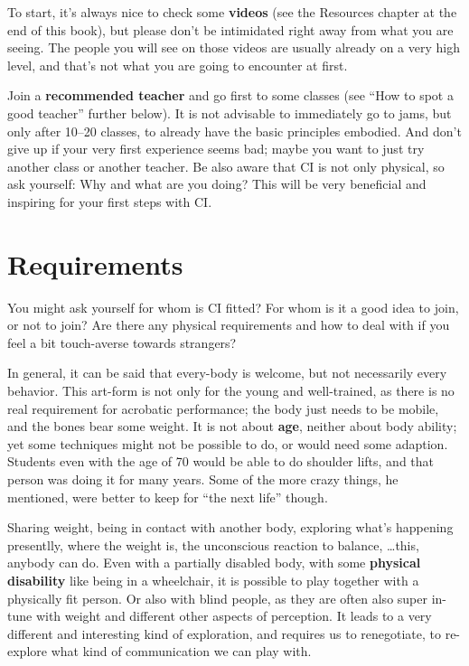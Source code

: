 To start, it's always nice to check some \textbf{videos} (see the Resources chapter at the end of this book), but please don't be intimidated right away from what you are seeing.
The people you will see on those videos are usually already on a very high level, and that's not what you are going to encounter at first.

Join a \textbf{recommended teacher} and go first to some classes (see ``How to spot a good teacher'' further below).
It is not advisable to immediately go to jams, but only after 10--20 classes, to already have the basic principles embodied.
And don't give up if your very first experience seems bad; maybe you want to just try another class or another teacher.
Be also aware that CI is not only physical, so ask yourself: Why and what are you doing?
This will be very beneficial and inspiring for your first steps with CI\@.

\section{Requirements}\label{sec:requirements}

You might ask yourself for whom is CI fitted?
For whom is it a good idea to join, or not to join?
Are there any physical requirements and how to deal with if you feel a bit touch-averse towards strangers?

In general, it can be said that every-body is welcome, but not necessarily every behavior.
This art-form is not only for the young and well-trained, as there is no real requirement for acrobatic performance; the body just needs to be mobile, and the bones bear some weight.
It is not about \textbf{age}, neither about body ability; yet some techniques might not be possible to do, or would need some adaption.
Students even with the age of 70 would be able to do shoulder lifts, and that person was doing it for many years.
Some of the more crazy things, he mentioned, were better to keep for ``the next life'' though.

Sharing weight, being in contact with another body, exploring what's happening presentlly, where the weight is, the unconscious reaction to balance, \ldots this, anybody can do.
Even with a partially disabled body, with some \textbf{physical disability} like being in a wheelchair, it is possible to play together with a physically fit person.
Or also with blind people, as they are often also super in-tune with weight and different other aspects of perception.
It leads to a very different and interesting kind of exploration, and requires us to renegotiate, to re-explore what kind of communication we can play with.

